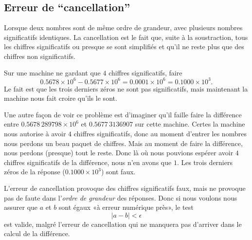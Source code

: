 \subsection{Erreur de ``cancellation''}

Lorsque deux nombres sont de même ordre de grandeur, avec plusieurs nombres significatifs identiques. La cancellation est le fait que, suite à la soustraction, tous les chiffres significatifs ou presque se sont simplifiés et qu'il ne reste plus que des chiffres non significatifs.

\begin{example}
    Sur une machine ne gardant que \( 4\) chiffres significatifs, faire
    \begin{equation}
        0.5678\times 10^6-0.5677\times 10^6 = 0.0001\times 10^6=0.1000\times 10^3.
    \end{equation}
    Le fait est que les trois derniers zéros ne sont pas significatifs, mais maintenant la machine nous fait croire qu'ils le sont.

    Une autre façon de voir ce problème est d'imaginer qu'il faille faire la différence entre \( 0.5678\,289798\times 10^6\) et \( 0.5677\,3136907\) sur cette machine. Certes la machine nous autorise à avoir \( 4\) chiffres significatifs, donc au moment d'entrer les nombres nous perdons un beau paquet de chiffres. Mais au moment de faire la différence, nous perdons (presque) tout le reste. Donc là où nous pouvions espérer avoir \( 4\) chiffres significatifs de la différence, nous n'en avons que \( 1\). Les trois derniers zéros de la réponse (\( 0.1000\times 10^3\)) sont faux.
\end{example}

\begin{remark}  \label{REMooRQIJooNLdAZE}
    L'erreur de cancellation provoque des chiffres significatifs faux, mais ne provoque pas de faute dans l'\emph{ordre de grandeur} des réponses. Donc si nous voulons nous assurer que \( a\) et \( b\) sont égaux «à erreur numérique près», le test
    \begin{equation}
        | a-b |<\epsilon
    \end{equation}
    est valide, malgré l'erreur de cancellation qui ne manquera pas d'arriver dans le calcul de la différence.
\end{remark}

